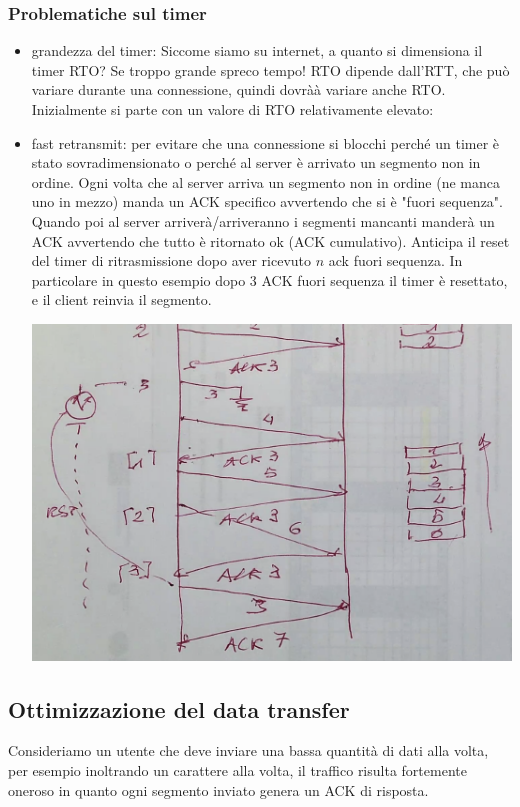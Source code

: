 \documentclass[11pt, oneside]{article}   	%
\begin{document}
\subsubsection*{Problematiche sul timer}
\begin{itemize}
\item grandezza del timer: Siccome siamo su internet, a quanto si dimensiona il timer RTO? Se troppo grande spreco tempo! RTO dipende dall'RTT, che può variare durante una connessione, quindi dovràà variare anche RTO. Inizialmente si parte con un valore di RTO relativamente elevato:
\item fast retransmit: per evitare che una connessione si blocchi perché un timer è stato sovradimensionato o perché al server è arrivato un segmento non in ordine. Ogni volta che al server arriva un segmento non in ordine (ne manca uno in mezzo) manda un ACK specifico avvertendo che si è "fuori sequenza". Quando poi al server arriverà/arriveranno i segmenti mancanti manderà un ACK avvertendo che tutto è ritornato ok (ACK cumulativo). 
Anticipa il reset del timer di ritrasmissione dopo aver ricevuto $n$ ack fuori sequenza. In particolare in questo esempio dopo 3 ACK fuori sequenza il timer è resettato, e il client reinvia il segmento.
\begin{center}
\includegraphics[scale=0.5]{t8}
\end{center}
\end{itemize}
\subsection*{Ottimizzazione del data transfer}
Consideriamo un utente che deve inviare una bassa quantità di dati alla volta, per esempio inoltrando un carattere alla volta, il traffico risulta fortemente oneroso in quanto ogni segmento inviato genera un ACK di risposta. 
\end{document}
